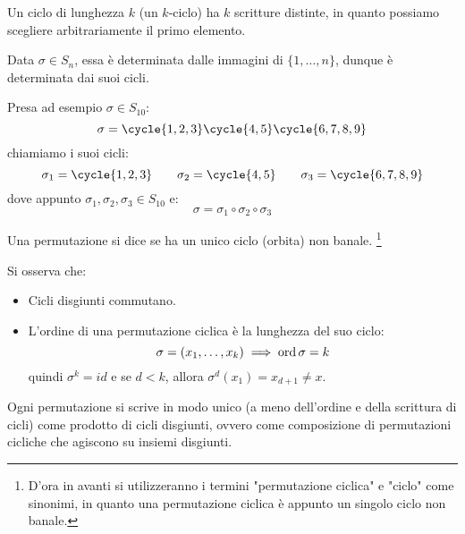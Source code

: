 \documentclass[11pt]{scrartcl}
\begin{document}
\begin{remark}
    Un ciclo di lunghezza $k$ (un $k$-ciclo) ha $k$ scritture distinte, in quanto possiamo scegliere arbitrariamente il primo elemento.
\end{remark}

\begin{remark}
    Data $\sigma \in S_n$, essa è determinata dalle immagini di $\{1,\ldots,n\}$, dunque è determinata dai suoi cicli.
\end{remark}

\begin{example}
    Presa ad esempio $\sigma \in S_{10}$:
        \[ \sigma = \cycle{1,2,3}\cycle{4,5}\cycle{6,7,8,9}
            \]
    chiamiamo i suoi cicli:
        \[ \sigma_1 = \cycle{1,2,3} \qquad \sigma_2 = \cycle{4,5} \qquad \sigma_3 = \cycle{6,7,8,9}
            \]
    dove appunto $\sigma_1,\sigma_2,\sigma_3 \in S_{10}$ e:
        \[ \sigma = \sigma_1 \circ \sigma_2 \circ \sigma_3
            \]
\end{example}

\begin{definition}
    Una permutazione si dice  se ha un unico ciclo (orbita) non banale. 
    \footnote{D'ora in avanti si utilizzeranno i termini "permutazione ciclica" e "ciclo" come sinonimi, in quanto una permutazione ciclica è appunto un singolo ciclo non banale.}
\end{definition}

\begin{remark}
    Si osserva che:
        \begin{itemize}
            \item Cicli disgiunti commutano.
            \item L'ordine di una permutazione ciclica è la lunghezza del suo ciclo:
                    \[ \sigma = (x_1,\ldots,x_k) \implies \operatorname{ord} \sigma = k
                        \]
                quindi $\sigma^k = id$ e se $d < k$, allora $\sigma^d(x_1) = x_{d+1} \ne x$.
        \end{itemize}
\end{remark}

\begin{proposition}
    \label{perm}
    Ogni permutazione si scrive in modo unico (a meno dell'ordine e della scrittura di cicli) come prodotto di cicli disgiunti,
     ovvero come composizione di permutazioni cicliche che agiscono su insiemi disgiunti.
\end{proposition}
\end{document}
